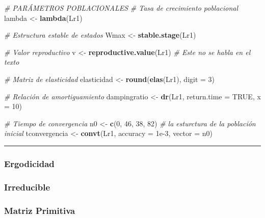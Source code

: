 \documentclass[
]{book}
\newenvironment{Shaded}{\begin{snugshade}}{\end{snugshade}}
\newcommand{\AttributeTok}[1]{\textcolor[rgb]{0.13,0.29,0.53}{#1}}
\newcommand{\CommentTok}[1]{\textcolor[rgb]{0.56,0.35,0.01}{\textit{#1}}}
\newcommand{\ConstantTok}[1]{\textcolor[rgb]{0.56,0.35,0.01}{#1}}
\newcommand{\DecValTok}[1]{\textcolor[rgb]{0.00,0.00,0.81}{#1}}
\newcommand{\FloatTok}[1]{\textcolor[rgb]{0.00,0.00,0.81}{#1}}
\newcommand{\FunctionTok}[1]{\textcolor[rgb]{0.13,0.29,0.53}{\textbf{#1}}}
\newcommand{\NormalTok}[1]{#1}
\newcommand{\OtherTok}[1]{\textcolor[rgb]{0.56,0.35,0.01}{#1}}
\theoremstyle{definition}
\theoremstyle{definition}
\theoremstyle{definition}
\theoremstyle{definition}
\theoremstyle{remark}
\begin{document}
\begin{Shaded}
\begin{Highlighting}[]
\CommentTok{\# PARÁMETROS POBLACIONALES}
\CommentTok{\# Tasa de crecimiento poblacional }
\NormalTok{lambda }\OtherTok{\textless{}{-}} \FunctionTok{lambda}\NormalTok{(Lr1)}

\CommentTok{\# Estructura estable de estados}
\NormalTok{Wmax }\OtherTok{\textless{}{-}} \FunctionTok{stable.stage}\NormalTok{(Lr1)}

\CommentTok{\# Valor reproductivo}
\NormalTok{v }\OtherTok{\textless{}{-}} \FunctionTok{reproductive.value}\NormalTok{(Lr1) }\CommentTok{\# Este no se habla en el texto}

\CommentTok{\# Matriz de elasticidad}
\NormalTok{elasticidad }\OtherTok{\textless{}{-}} \FunctionTok{round}\NormalTok{(}\FunctionTok{elas}\NormalTok{(Lr1), }\AttributeTok{digit =} \DecValTok{3}\NormalTok{)}

\CommentTok{\# Relación de amortiguamiento}
\NormalTok{dampingratio }\OtherTok{\textless{}{-}} \FunctionTok{dr}\NormalTok{(Lr1, }\AttributeTok{return.time =} \ConstantTok{TRUE}\NormalTok{, }\AttributeTok{x =} \DecValTok{10}\NormalTok{)}

\CommentTok{\# Tiempo de convergencia}
\NormalTok{n0 }\OtherTok{\textless{}{-}} \FunctionTok{c}\NormalTok{(}\DecValTok{0}\NormalTok{, }\DecValTok{46}\NormalTok{, }\DecValTok{38}\NormalTok{, }\DecValTok{82}\NormalTok{) }\CommentTok{\# la esturctura de la población inicial}
\NormalTok{tconvergencia }\OtherTok{\textless{}{-}} \FunctionTok{convt}\NormalTok{(Lr1, }\AttributeTok{accuracy =} \FloatTok{1e{-}3}\NormalTok{, }\AttributeTok{vector =}\NormalTok{ n0)}
\end{Highlighting}
\end{Shaded}

\begin{center}\rule{0.5\linewidth}{0.5pt}\end{center}

\subsubsection{Ergodicidad}\label{ergodicidad}

\subsubsection{Irreducible}\label{irreducible}

\subsubsection{Matriz Primitiva}\label{matriz-primitiva}
\end{document}
